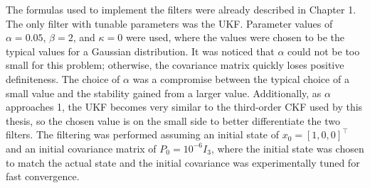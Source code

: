 \documentclass[../zhang_thesis.tex]{subfiles}
\begin{document}
The formulas used to implement the filters were already described in Chapter 1. The only filter with tunable parameters was the UKF. Parameter values of $\alpha=0.05$, $\beta=2$, and $\kappa=0$ were used, where the values were chosen to be the typical values for a Gaussian distribution. It was noticed that $\alpha$ could not be too small for this problem; otherwise, the covariance matrix quickly loses positive definiteness. The choice of $\alpha$ was a compromise between the typical
choice of a small value and the stability gained from a larger value. Additionally, as $\alpha$ approaches 1, the UKF becomes very similar to the third-order CKF used by this thesis, so the chosen value is on the small side to better differentiate the two filters. The filtering was performed assuming an initial state of $x_0=[1,0,0]^\top$ and an initial covariance matrix of $P_0=10^{-6} I_3$, where the initial state was chosen to match the actual state and the initial covariance was experimentally tuned for fast convergence. 
\end{document}
